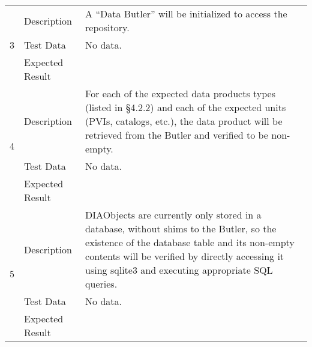 \begin{longtable}[]{p{1.3cm}p{2cm}p{13cm}}
\multirow{3}{*}{ 3 } & Description &
\begin{minipage}[t]{13cm}{\footnotesize
A ``Data Butler'' will be initialized to access the repository.

\vspace{\dp0}
} \end{minipage} \\ \cline{2-3}
& Test Data &
\begin{minipage}[t]{13cm}{\footnotesize
No data.
\vspace{\dp0}
} \end{minipage} \\ \cline{2-3}
& Expected Result &
\\ \midrule

\multirow{3}{*}{ 4 } & Description &
\begin{minipage}[t]{13cm}{\footnotesize
For each of the expected data products types (listed in §4.2.2) and each
of the expected units (PVIs, catalogs, etc.), the data product will be
retrieved from the Butler and verified to be non-empty.

\vspace{\dp0}
} \end{minipage} \\ \cline{2-3}
& Test Data &
\begin{minipage}[t]{13cm}{\footnotesize
No data.
\vspace{\dp0}
} \end{minipage} \\ \cline{2-3}
& Expected Result &
\\ \midrule

\multirow{3}{*}{ 5 } & Description &
\begin{minipage}[t]{13cm}{\footnotesize
DIAObjects are currently only stored in a database, without shims to the
Butler, so the existence of the database table and its non-empty
contents will be verified by directly accessing it using sqlite3 and
executing appropriate SQL queries.

\vspace{\dp0}
} \end{minipage} \\ \cline{2-3}
& Test Data &
\begin{minipage}[t]{13cm}{\footnotesize
No data.
\vspace{\dp0}
} \end{minipage} \\ \cline{2-3}
& Expected Result &
\\ \midrule
\end{longtable}

